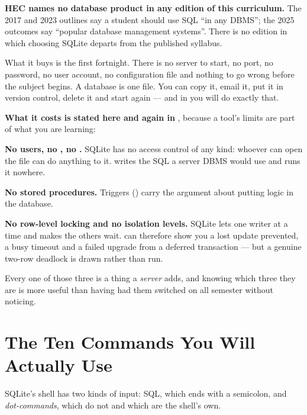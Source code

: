 \begin{alertbox}
\textbf{HEC names no database product in any edition of this curriculum.} The
2017 and 2023 outlines say a student should use SQL ``in any DBMS''; the 2025
outcomes say ``popular database management systems''. There is no edition in
which choosing SQLite departs from the published syllabus.

\smallskip
What it buys is the first fortnight. There is no server to start, no port, no
password, no user account, no configuration file and nothing to go wrong
before the subject begins. A database is one file. You can copy it, email it,
put it in version control, delete it and start again --- and in 
you will do exactly that.

\smallskip
\textbf{What it costs is stated here and again in }, because a
tool's limits are part of what you are learning:

\begin{tight}
  \item \textbf{No users, no , no .} SQLite has no
        access control of any kind: whoever can open the file can do anything
        to it.  writes the SQL a server DBMS would use and runs
        it nowhere.
  \item \textbf{No stored procedures.} Triggers () carry the
        argument about putting logic in the database.
  \item \textbf{No row-level locking and no isolation levels.} SQLite lets one
        writer at a time and makes the others wait.  can
        therefore show you a lost update prevented, a busy timeout and a failed
        upgrade from a deferred transaction --- but a genuine two-row deadlock
        is drawn rather than run.
\end{tight}

\smallskip
Every one of those three is a thing a \emph{server} adds, and knowing which
three they are is more useful than having had them switched on all semester
without noticing.
\end{alertbox}

\section{The Ten Commands You Will Actually Use}

SQLite's shell has two kinds of input: SQL, which ends with a semicolon, and
\emph{dot-commands}, which do not and which are the shell's own.


